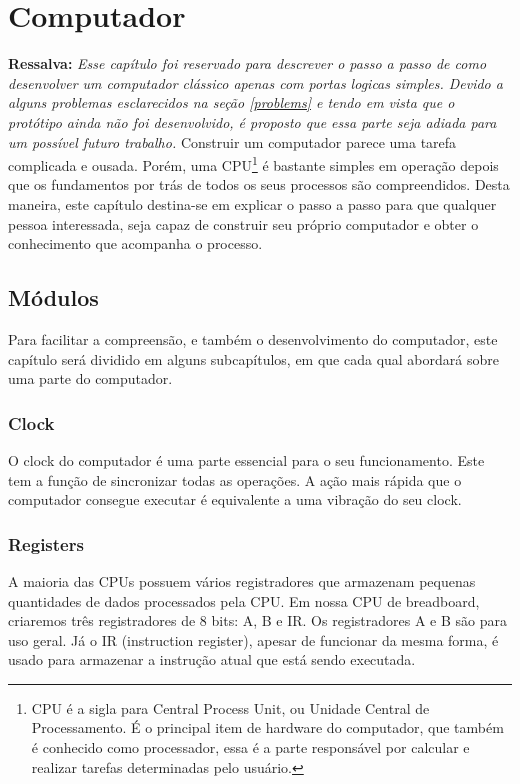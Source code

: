 \section{Computador} 
\textbf{Ressalva: }
\textit{Esse capítulo foi reservado para descrever o passo a passo de como desenvolver um computador clássico apenas com portas logicas simples. Devido a alguns problemas esclarecidos na seção \ref{problems} e tendo em vista que o protótipo ainda não foi desenvolvido, é proposto que essa parte seja adiada para um possível futuro trabalho.}
\newline
\newline
Construir um computador parece uma tarefa complicada e ousada. Porém, uma CPU\footnote{CPU é a sigla para Central Process Unit, ou Unidade Central de Processamento. É o principal item de hardware do computador, que também é conhecido como processador, essa é a parte responsável por calcular e realizar tarefas determinadas pelo usuário.} é bastante simples em operação depois que os fundamentos por trás de todos os seus processos são compreendidos. Desta maneira, este capítulo destina-se em explicar o passo a passo para que qualquer pessoa interessada, seja capaz de construir seu próprio computador e obter o conhecimento que acompanha o processo.

\subsection{Módulos}
Para facilitar a compreensão, e também o desenvolvimento do computador, este capítulo será dividido em alguns subcapítulos, em que cada qual abordará sobre uma parte do computador.

\subsubsection{Clock}
O clock do computador é uma parte essencial para o seu funcionamento. Este tem a função de sincronizar todas as operações. A ação mais rápida que o computador consegue executar é equivalente a uma vibração do seu clock.

\subsubsection{Registers}
A maioria das CPUs possuem vários registradores que armazenam pequenas quantidades de dados processados pela CPU. Em nossa CPU de breadboard, criaremos três registradores de 8 bits: A, B e IR. Os registradores A e B são para uso geral. Já o IR (instruction register), apesar de funcionar da mesma forma, é usado para armazenar a instrução atual que está sendo executada.

